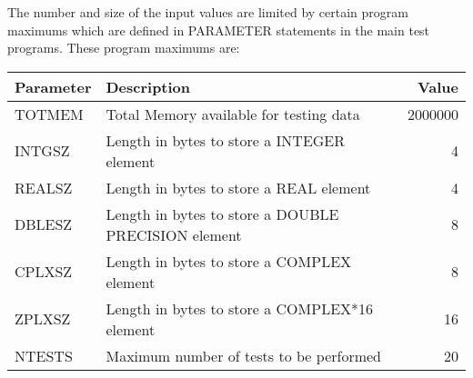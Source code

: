 \documentclass[11pt]{report}
\newcommand{\keep}[1]{\vspace{11pt}\parbox{\textwidth}{#1}\vspace{11pt}}
\begin{document}

The number and size of the input values are limited by certain program
maximums which are defined in PARAMETER statements in the
main test programs.  These program maximums are:

%
\keep{
\begin{tabular}{l l r}
Parameter & Description                             & Value \\ \hline
TOTMEM    & Total Memory available for testing data &  2000000 \\
INTGSZ    & Length in bytes to store a INTEGER element &  4 \\
REALSZ    & Length in bytes to store a REAL element &  4 \\
DBLESZ    & Length in bytes to store a DOUBLE PRECISION element &  8 \\
CPLXSZ    & Length in bytes to store a COMPLEX element &  8 \\
ZPLXSZ    & Length in bytes to store a COMPLEX*16 element &  16 \\
NTESTS   & Maximum number of tests to be performed         &  20 \\
\end{tabular}
}
\end{document}
